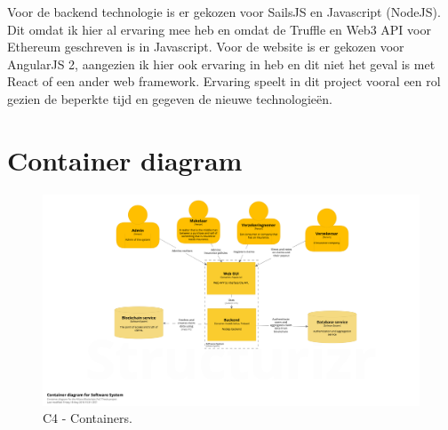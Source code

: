 Voor de backend technologie is er gekozen voor SailsJS en Javascript (NodeJS). Dit omdat ik hier al ervaring mee heb en omdat de Truffle en Web3 API voor Ethereum geschreven is in Javascript. Voor de website is er gekozen voor AngularJS 2, aangezien ik hier ook ervaring in heb en dit niet het geval is met React of een ander web framework. Ervaring speelt in dit project vooral een rol gezien de beperkte tijd en gegeven de nieuwe technologieën.

\newpage

\section{Container diagram}

\begin{figure}[h!]
    \begin{center}
        \includegraphics[width=\paperwidth-100]{images/containers}
        \caption{C4 - Containers.}
        \label{fig:c4Containers}
    \end{center}
\end{figure}
